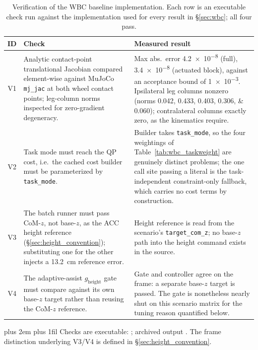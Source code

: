 \documentclass[conference]{IEEEtran}
\newcommand{\tabnote}{\par\leftskip=0pt\rightskip=0pt plus 2em%
  \parfillskip=0pt plus 1fil\relax}
\begin{document}
\begin{table}[h]
\centering
\caption{Verification of the WBC baseline implementation. Each row is an executable check run against the implementation used for every result in \S\ref{sec:wbc}; all four pass.}
\label{tab:wbc_verification}
\footnotesize
\begin{tabularx}{\columnwidth}{@{}c>{\raggedright\arraybackslash}X>{\raggedright\arraybackslash}X@{}}
\toprule
ID & Check & Measured result \\
\midrule
V1 & Analytic contact-point translational Jacobian compared element-wise against MuJoCo \texttt{mj\_jac} at both wheel contact points; leg-column norms inspected for zero-gradient degeneracy. &
Max abs.\ error \num{4.2e-8} (full), \num{3.4e-8} (actuated block), against an acceptance bound of \num{1e-3}. Ipsilateral leg columns nonzero (norms \numlist{0.042;0.433;0.403;0.306;0.060}); contralateral columns exactly zero, as the kinematics require. \\
V2 & Task mode must reach the QP cost, i.e.\ the cached cost builder must be parameterized by \texttt{task\_mode}. &
Builder takes \texttt{task\_mode}, so the four weightings of Table~\ref{tab:wbc_taskweight} are genuinely distinct problems; the one call site passing a literal is the task-independent constraint-only fallback, which carries no cost terms by construction. \\
V3 & The batch runner must pass CoM-$z$, not base-$z$, as the ACC height reference (\S\ref{sec:height_convention}); substituting one for the other injects a \SI{13.2}{cm} reference error. &
Height reference is read from the scenario's \texttt{target\_com\_z}; no base-$z$ path into the height command exists in the source. \\
V4 & The adaptive-assist $g_{\text{height}}$ gate must compare against its own base-$z$ target rather than reusing the CoM-$z$ reference. &
Gate and controller agree on the frame: a separate base-$z$ target is passed. The gate is nonetheless nearly shut on this scenario matrix for the tuning reason quantified below. \\
\bottomrule
\end{tabularx}
\vspace{4pt}\tabnote\noindent\footnotesize
Checks are executable: ; archived output .
The frame distinction underlying V3/V4 is defined in \S\ref{sec:height_convention}.
\end{table}
\end{document}
